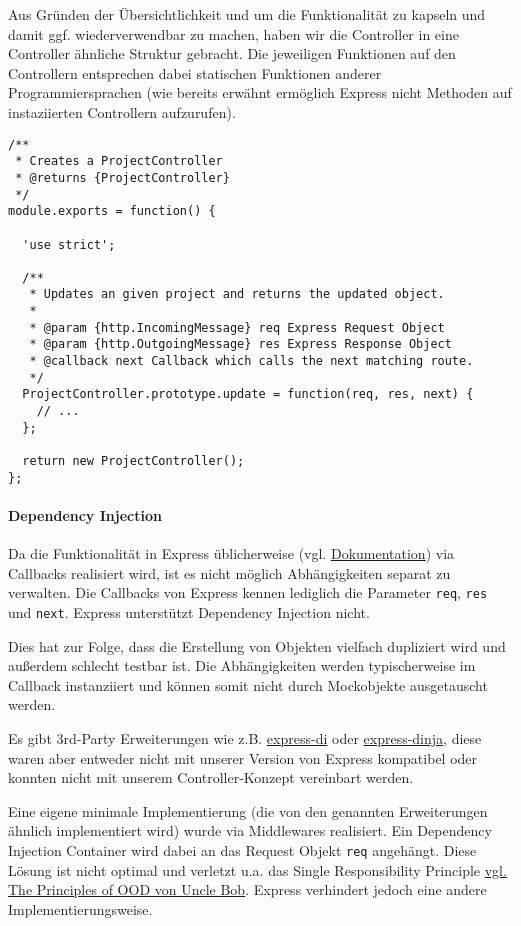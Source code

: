 \documentclass[]{article}
\begin{document}
Aus Gründen der Übersichtlichkeit und um die Funktionalität zu kapseln
und damit ggf. wiederverwendbar zu machen, haben wir die Controller in
eine Controller ähnliche Struktur gebracht. Die jeweiligen Funktionen
auf den Controllern entsprechen dabei statischen Funktionen anderer
Programmiersprachen (wie bereits erwähnt ermöglich Express nicht
Methoden auf instaziierten Controllern aufzurufen).

\begin{verbatim}
/**
 * Creates a ProjectController
 * @returns {ProjectController}
 */
module.exports = function() {

  'use strict';

  /**
   * Updates an given project and returns the updated object.
   *
   * @param {http.IncomingMessage} req Express Request Object
   * @param {http.OutgoingMessage} res Express Response Object
   * @callback next Callback which calls the next matching route.
   */
  ProjectController.prototype.update = function(req, res, next) {
    // ...
  };

  return new ProjectController();
};
\end{verbatim}

\paragraph{Dependency Injection}\label{dependency-injection}

Da die Funktionalität in Express üblicherweise (vgl.
\href{http://expressjs.com/en/starter/basic-routing.html}{Dokumentation})
via Callbacks realisiert wird, ist es nicht möglich Abhängigkeiten
separat zu verwalten. Die Callbacks von Express kennen lediglich die
Parameter \texttt{req}, \texttt{res} und \texttt{next}. Express
unterstützt Dependency Injection nicht.

Dies hat zur Folge, dass die Erstellung von Objekten vielfach dupliziert
wird und außerdem schlecht testbar ist. Die Abhängigkeiten werden
typischerweise im Callback instanziiert und können somit nicht durch
Mockobjekte ausgetauscht werden.

Es gibt 3rd-Party Erweiterungen wie z.B.
\href{https://github.com/luin/express-di}{express-di} oder
\href{https://github.com/floatdrop/express-dinja}{express-dinja}, diese
waren aber entweder nicht mit unserer Version von Express kompatibel
oder konnten nicht mit unserem Controller-Konzept vereinbart werden.

Eine eigene minimale Implementierung (die von den genannten
Erweiterungen ähnlich implementiert wird) wurde via Middlewares
realisiert. Ein Dependency Injection Container wird dabei an das Request
Objekt \texttt{req} angehängt. Diese Lösung ist nicht optimal und
verletzt u.a. das Single Responsibility Principle
\href{http://www.butunclebob.com/ArticleS.UncleBob.PrinciplesOfOod}{vgl.
The Principles of OOD von Uncle Bob}. Express verhindert jedoch eine
andere Implementierungsweise.
\end{document}
